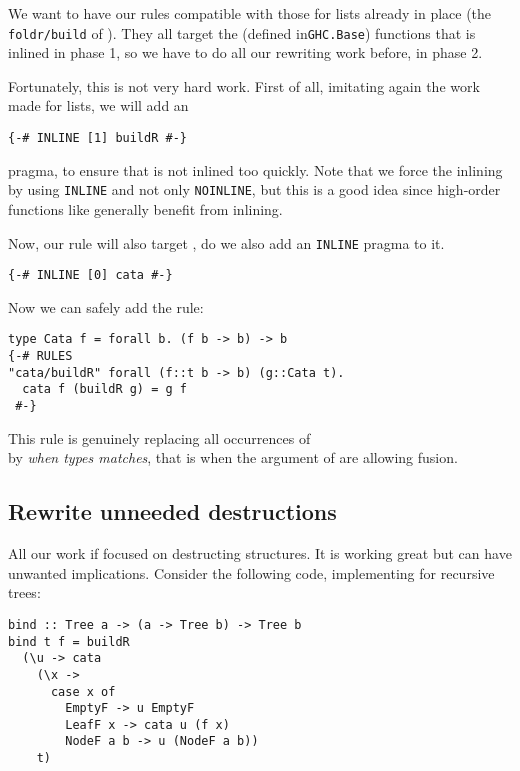 We want to have our rules compatible with those for lists already in place (the \verb|foldr/build| of \cite{Gill:1993:SCD:165180.165214}). They all target the  (defined in\verb|GHC.Base|) functions that is inlined in phase 1, so we have to do all our rewriting work before, in phase 2.

Fortunately, this is not very hard work. First of all, imitating again the work made for lists, we will add an
\begin{verbatim}
{-# INLINE [1] buildR #-}
\end{verbatim}
pragma, to ensure that  is not inlined too quickly. Note that we force the inlining by using \verb|INLINE| and not only \verb|NOINLINE|, but this is a good idea since high-order functions like  generally benefit from inlining.

Now, our rule will also target , do we also add an \verb|INLINE| pragma to it.
\begin{verbatim}
{-# INLINE [0] cata #-}
\end{verbatim}

Now we can safely add the rule:
\begin{verbatim}
type Cata f = forall b. (f b -> b) -> b
{-# RULES
"cata/buildR" forall (f::t b -> b) (g::Cata t).
  cata f (buildR g) = g f
 #-}
\end{verbatim}
This rule is genuinely replacing all occurrences of\\  by  \emph{when types matches}, that is when the argument of  are allowing fusion.

\subsection{Rewrite unneeded destructions}
\label{sec:bind-def}
All our work if focused on destructing structures. It is working great but can have unwanted implications. Consider the following code, implementing  for recursive trees:

\begin{verbatim}
bind :: Tree a -> (a -> Tree b) -> Tree b
bind t f = buildR
  (\u -> cata
    (\x ->
      case x of
        EmptyF -> u EmptyF
        LeafF x -> cata u (f x)
        NodeF a b -> u (NodeF a b))
    t)
\end{verbatim}


